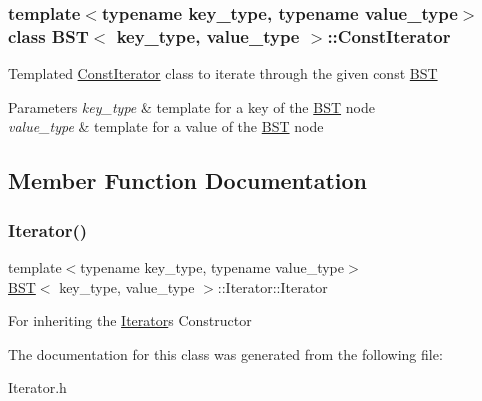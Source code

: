 \subsubsection*{template$<$typename key\+\_\+type, typename value\+\_\+type$>$\newline
class B\+S\+T$<$ key\+\_\+type, value\+\_\+type $>$\+::\+Const\+Iterator}

Templated \mbox{\hyperlink{class_b_s_t_1_1_const_iterator}{Const\+Iterator}} class to iterate through the given const \mbox{\hyperlink{class_b_s_t}{B\+ST}} 
\begin{DoxyParams}{Parameters}
{\em key\+\_\+type} & template for a key of the \mbox{\hyperlink{class_b_s_t}{B\+ST}} node \\
\hline
{\em value\+\_\+type} & template for a value of the \mbox{\hyperlink{class_b_s_t}{B\+ST}} node \\
\hline
\end{DoxyParams}


\subsection{Member Function Documentation}
\mbox{\label{class_b_s_t_1_1_const_iterator_af7bc2cb09f5e0e7c94ec2074c1ac1982}} 
\subsubsection{\texorpdfstring{Iterator()}{Iterator()}}
{\footnotesize\ttfamily template$<$typename key\+\_\+type, typename value\+\_\+type$>$ \\
\mbox{\hyperlink{class_b_s_t}{B\+ST}}$<$ key\+\_\+type, value\+\_\+type $>$\+::Iterator\+::\+Iterator\hspace{0.3cm}{\ttfamily [inline]}}

For inheriting the \mbox{\hyperlink{class_b_s_t_1_1_iterator}{Iterator}}\textquotesingle{}s Constructor 

The documentation for this class was generated from the following file\+:\begin{DoxyCompactItemize}
\item 
Iterator.\+h\end{DoxyCompactItemize}

